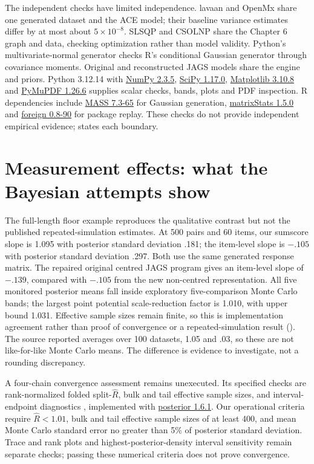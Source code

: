 The independent checks have limited independence. lavaan and OpenMx share one generated dataset and the ACE model; their baseline variance estimates differ by at most about $5\times10^{-8}$. SLSQP and CSOLNP share the Chapter 6 graph and data, checking optimization rather than model validity. Python's multivariate-normal generator checks R's conditional Gaussian generator through covariance moments. Original and reconstructed JAGS models share the engine and priors. Python 3.12.14 with \href{https://numpy.org/}{NumPy 2.3.5}, \href{https://scipy.org/}{SciPy 1.17.0}, \href{https://matplotlib.org/}{Matplotlib 3.10.8} and \href{https://pymupdf.readthedocs.io/}{PyMuPDF 1.26.6} supplies scalar checks, bands, plots and PDF inspection. R dependencies include \href{https://CRAN.R-project.org/package=MASS}{MASS 7.3-65} for Gaussian generation, \href{https://CRAN.R-project.org/package=matrixStats}{matrixStats 1.5.0} and \href{https://CRAN.R-project.org/package=foreign}{foreign 0.8-90} for package replay. These checks do not provide independent empirical evidence;  states each boundary.

\section{Measurement effects: what the Bayesian attempts show}
The full-length floor example reproduces the qualitative contrast but not the published repeated-simulation estimates. At 500 pairs and 60 items, our sumscore slope is 1.095 with posterior standard deviation .181; the item-level slope is $-.105$ with posterior standard deviation .297. Both use the same generated response matrix. The repaired original centred JAGS program gives an item-level slope of $-.139$, compared with $-.105$ from the new non-centred representation. All five monitored posterior means fall inside exploratory five-comparison Monte Carlo bands; the largest point potential scale-reduction factor is 1.010, with upper bound 1.031. Effective sample sizes remain finite, so this is implementation agreement rather than proof of convergence or a repeated-simulation result (). The source reported averages over 100 datasets, 1.05 and .03, so these are not like-for-like Monte Carlo means. The difference is evidence to investigate, not a rounding discrepancy.

A four-chain convergence assessment remains unexecuted. Its specified checks are rank-normalized folded split-$\widehat R$, bulk and tail effective sample sizes, and interval-endpoint diagnostics \citep{vehtari2021}, implemented with \href{https://github.com/stan-dev/posterior/tree/v1.6.1}{posterior 1.6.1}. Our operational criteria require $\widehat R<1.01$, bulk and tail effective sample sizes of at least 400, and mean Monte Carlo standard error no greater than 5\% of posterior standard deviation. Trace and rank plots and highest-posterior-density interval sensitivity remain separate checks; passing these numerical criteria does not prove convergence.

